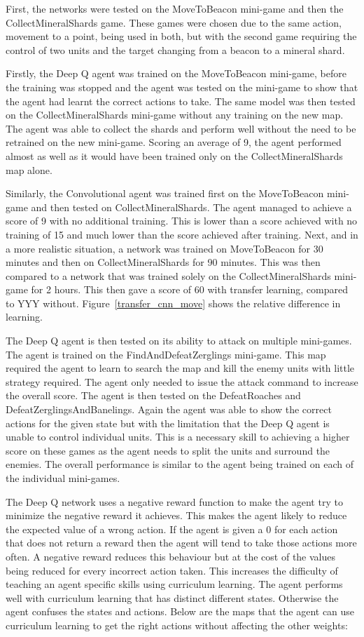First, the networks were tested on the MoveToBeacon mini-game and then the
CollectMineralShards game. These games were chosen due to the same action,
movement to a point, being used in both, but with the second game requiring the
control of two units and the target changing from a beacon to a mineral shard.

Firstly, the Deep Q agent was trained on the MoveToBeacon mini-game, before the
training was stopped and the agent was tested on the mini-game to show that the
agent had learnt the correct actions to take. The same model was then tested on
the CollectMineralShards mini-game without any training on the new map. The
agent was able to collect the shards and perform well without the need to be
retrained on the new mini-game. Scoring an average of 9, the agent performed
almost as well as it would have been trained only on the CollectMineralShards
map alone.

Similarly, the Convolutional agent was trained first on the MoveToBeacon
mini-game and then tested on CollectMineralShards. The agent managed to achieve
a score of 9 with no additional training. This is lower than a score achieved
with no training of 15 and much lower than the score achieved after training.
Next, and in a more realistic situation, a network was trained on MoveToBeacon
for 30 minutes and then on CollectMineralShards for 90 minutes. This was then
compared to a network that was trained solely on the CollectMineralShards
mini-game for 2 hours. This then gave a score of 60 with transfer learning,
compared to YYY without. Figure~\ref{transfer_cnn_move} shows the relative
difference in learning.

The Deep Q agent is then tested on its ability to attack on multiple mini-games.
The agent is trained on the FindAndDefeatZerglings mini-game. This map required
the agent to learn to search the map and kill the enemy units with little
strategy required. The agent only needed to issue the attack command to increase
the overall score. The agent is then tested on the DefeatRoaches and
DefeatZerglingsAndBanelings. Again the agent was able to show the correct
actions for the given state but with the limitation that the Deep Q agent is
unable to control individual units. This is a necessary skill to achieving a
higher score on these games as the agent needs to split the units and surround
the enemies. The overall performance is similar to the agent being trained on
each of the individual mini-games.

The Deep Q network uses a negative reward function to make the agent try to
minimize the negative reward it achieves. This makes the agent likely to reduce
the expected value of a wrong action. If the agent is given a 0 for each action
that does not return a reward then the agent will tend to take those actions
more often. A negative reward reduces this behaviour but at the cost of the
values being reduced for every incorrect action taken. This increases the
difficulty of teaching an agent specific skills using curriculum learning. The
agent performs well with curriculum learning that has distinct different states.
Otherwise the agent confuses the states and actions. Below are the maps that the
agent can use curriculum learning to get the right actions without affecting the
other weights:

